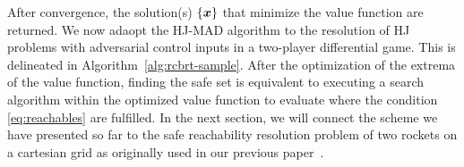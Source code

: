 After convergence, the solution(s) $\{\bm{x}\}$ that minimize the value function are returned. We now adaopt the HJ-MAD algorithm to the resolution of HJ problems with adversarial control inputs in a two-player differential game. This is delineated in Algorithm~\ref{alg:rcbrt-sample}.
After the optimization of the extrema of the value function, finding the safe set is equivalent to executing a search algorithm within the optimized value function to evaluate where the condition \eqref{eq:reachables} are fulfilled. In the next section, we will connect the scheme we have presented so far to the safe reachability resolution problem of two rockets on a cartesian grid as originally used in our previous paper~\citet{levpyconf}.
